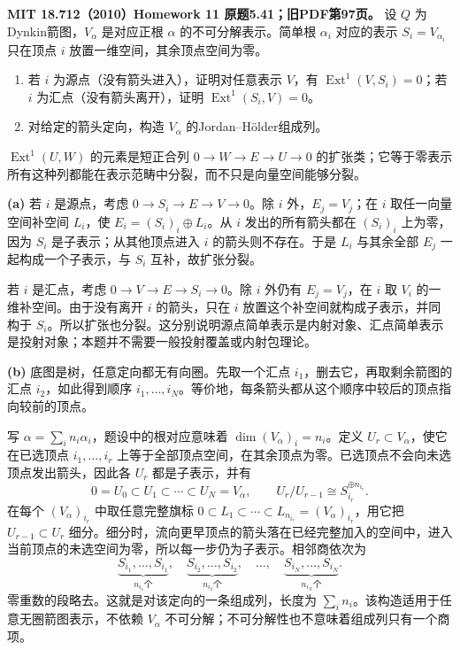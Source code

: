 \begin{exercise}\label{hw:5.41}
\textbf{MIT 18.712（2010）Homework 11 原题5.41；旧PDF第97页。}
设 $Q$ 为Dynkin箭图，$V_\alpha$ 是对应正根 $\alpha$ 的不可分解表示。简单根 $\alpha_i$ 对应的表示 $S_i=V_{\alpha_i}$ 只在顶点 $i$ 放置一维空间，其余顶点空间为零。
\begin{enumerate}[label=(\alph*)]
\item 若 $i$ 为源点（没有箭头进入），证明对任意表示 $V$，有 $\operatorname{Ext}^1(V,S_i)=0$；若 $i$ 为汇点（没有箭头离开），证明 $\operatorname{Ext}^1(S_i,V)=0$。
\item 对给定的箭头定向，构造 $V_\alpha$ 的Jordan--H\"older组成列。
\end{enumerate}
\end{exercise}
\begin{solution}
$\operatorname{Ext}^1(U,W)$ 的元素是短正合列 $0\to W\to E\to U\to0$ 的扩张类；它等于零表示所有这种列都能在表示范畴中分裂，而不只是向量空间能够分裂。

\textbf{(a)} 若 $i$ 是源点，考虑 $0\to S_i\to E\to V\to0$。除 $i$ 外，$E_j=V_j$；在 $i$ 取任一向量空间补空间 $L_i$，使 $E_i=(S_i)_i\oplus L_i$。从 $i$ 发出的所有箭头都在 $(S_i)_i$ 上为零，因为 $S_i$ 是子表示；从其他顶点进入 $i$ 的箭头则不存在。于是 $L_i$ 与其余全部 $E_j$ 一起构成一个子表示，与 $S_i$ 互补，故扩张分裂。

若 $i$ 是汇点，考虑 $0\to V\to E\to S_i\to0$。除 $i$ 外仍有 $E_j=V_j$，在 $i$ 取 $V_i$ 的一维补空间。由于没有离开 $i$ 的箭头，只在 $i$ 放置这个补空间就构成子表示，并同构于 $S_i$。所以扩张也分裂。这分别说明源点简单表示是内射对象、汇点简单表示是投射对象；本题并不需要一般投射覆盖或内射包理论。

\textbf{(b)} 底图是树，任意定向都无有向圈。先取一个汇点 $i_1$，删去它，再取剩余箭图的汇点 $i_2$，如此得到顺序 $i_1,\ldots,i_N$。等价地，每条箭头都从这个顺序中较后的顶点指向较前的顶点。

写 $\alpha=\sum_i n_i\alpha_i$，题设中的根对应意味着 $\dim(V_\alpha)_i=n_i$。定义 $U_r\subset V_\alpha$，使它在已选顶点 $i_1,\ldots,i_r$ 上等于全部顶点空间，在其余顶点为零。已选顶点不会向未选顶点发出箭头，因此各 $U_r$ 都是子表示，并有
\[
 0=U_0\subset U_1\subset\cdots\subset U_N=V_\alpha,
 \qquad U_r/U_{r-1}\cong S_{i_r}^{\oplus n_{i_r}}.
\]
在每个 $(V_\alpha)_{i_r}$ 中取任意完整旗标
$0\subset L_1\subset\cdots\subset L_{n_{i_r}}=(V_\alpha)_{i_r}$，用它把 $U_{r-1}\subset U_r$ 细分。细分时，流向更早顶点的箭头落在已经完整加入的空间中，进入当前顶点的未选空间为零，所以每一步仍为子表示。相邻商依次为
\[
 \underbrace{S_{i_1},\ldots,S_{i_1}}_{n_{i_1}\text{个}},\quad
 \underbrace{S_{i_2},\ldots,S_{i_2}}_{n_{i_2}\text{个}},\quad\ldots,\quad
 \underbrace{S_{i_N},\ldots,S_{i_N}}_{n_{i_N}\text{个}}.
\]
零重数的段略去。这就是对该定向的一条组成列，长度为 $\sum_i n_i$。该构造适用于任意无圈箭图表示，不依赖 $V_\alpha$ 不可分解；不可分解性也不意味着组成列只有一个商项。
\end{solution}
